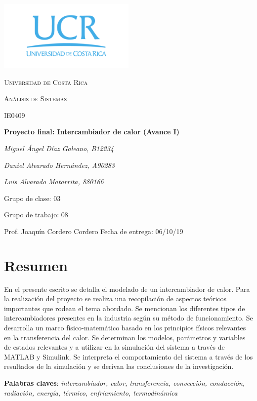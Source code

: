 \documentclass[12pt,letterpaper]{article}     %
\begin{document}

\begin{titlepage}
	\centering
	\includegraphics[width=0.5\textwidth]{Imagines/logo_ucr.png}\par\vspace{1cm}
	{\scshape\LARGE Universidad de Costa Rica \par}
	\vspace{0.5cm}
	{\scshape\Large Análisis de Sistemas \par}
	\vspace{.2cm}
    {\scshape\Large IE0409 \par}
	\vspace{1cm}
	{\Large\bfseries Proyecto final: Intercambiador de calor (Avance I)\par}
	\vspace{1cm}
    {\itshape Miguel Ángel Díaz Galeano, B12234 \par}
    {\itshape Daniel Alvarado Hernández, A90283 \par}
    {\itshape Luis Alvarado Matarrita, 880166      \par}
    {\itshape       \par}
    
    
	\vfill
    Grupo de clase: 03 \par
    Grupo de trabajo: 08 \par
	Prof. Joaquín Cordero Cordero
	\vfill
	{Fecha de entrega: 06/10/19}
\end{titlepage}

\section*{Resumen}
En el presente escrito se detalla el modelado de un intercambiador de calor. Para la realización del proyecto se realiza una recopilación de aspectos teóricos importantes que rodean el tema abordado. Se mencionan los diferentes tipos de intercambiadores presentes en la industria según su método de funcionamiento.
Se desarrolla un marco físico-matemático basado en los principios físicos relevantes en la transferencia del calor. 
Se determinan los modelos, parámetros y variables de estados relevantes y a utilizar en la simulación del sistema a través de MATLAB y Simulink.
Se interpreta el comportamiento del sistema a través de los resultados de la simulación y se derivan las conclusiones de la investigación. \\
\par
\begin{small}
\textbf{Palabras claves}: \textit{intercambiador, calor, transferencia, convección, conducción, radiación, energía, térmico, enfriamiento, termodinámica }
\end{small}
\end{document}
